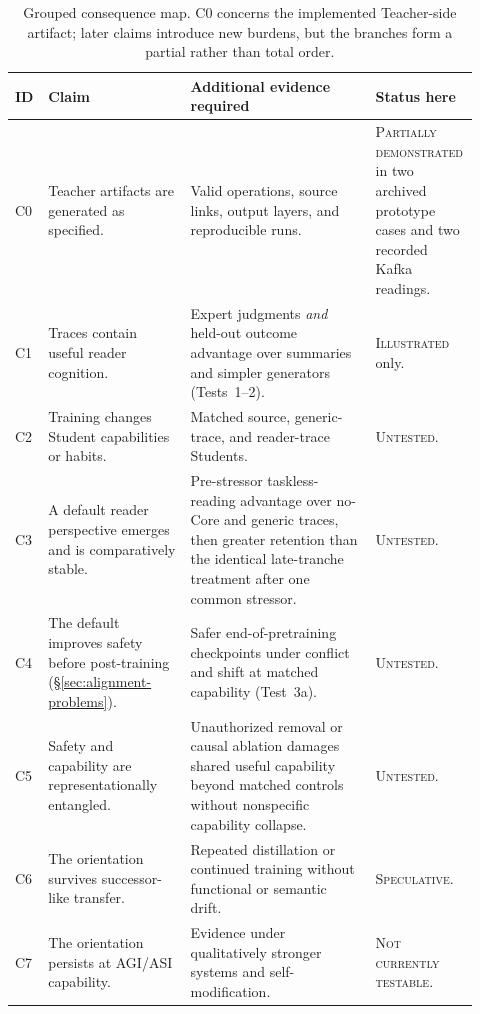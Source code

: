 \documentclass[11pt]{article}
\newcommand{\statusIllustrated}{\textcolor{hypothesisBlue}{\textsc{Illustrated}}}
\newcommand{\statusUntested}{\textcolor{hypothesisBlue}{\textsc{Untested}}}
\newcommand{\statusSpeculative}{\textcolor{speculationPurple}{\textsc{Speculative}}}
\newcommand{\statusNotTestable}{\textcolor{speculationPurple}{\textsc{Not currently testable}}}
\begin{document}
\begin{table}[H]
\centering
\small
\begin{tabular}{@{}>{\raggedright\arraybackslash}p{0.07\linewidth}
                    >{\raggedright\arraybackslash}p{0.30\linewidth}
                    >{\raggedright\arraybackslash}p{0.39\linewidth}
                    >{\raggedright\arraybackslash}p{0.16\linewidth}@{}}
\toprule
\textbf{ID} & \textbf{Claim} & \textbf{Additional evidence required} & \textbf{Status here} \\
\midrule
C0 & Teacher artifacts are generated as specified. & Valid operations, source links, output layers, and reproducible runs. & \textcolor{hypothesisBlue}{\textsc{Partially demonstrated}} in two archived prototype cases and two recorded Kafka readings. \\
C1 & Traces contain useful reader cognition. & Expert judgments \emph{and} held-out outcome advantage over summaries and simpler generators (Tests~1--2). & \statusIllustrated{} only. \\
C2 & Training changes Student capabilities or habits. & Matched source, generic-trace, and reader-trace Students. & \statusUntested. \\
C3 & A default reader perspective emerges and is comparatively stable. & Pre-stressor taskless-reading advantage over no-Core and generic traces, then greater retention than the identical late-tranche treatment after one common stressor. & \statusUntested. \\
C4 & The default improves safety before post-training (\S\ref{sec:alignment-problems}). & Safer end-of-pretraining checkpoints under conflict and shift at matched capability (Test~3a). & \statusUntested. \\
C5 & Safety and capability are representationally entangled. & Unauthorized removal or causal ablation damages shared useful capability beyond matched controls without nonspecific capability collapse. & \statusUntested. \\
C6 & The orientation survives successor-like transfer. & Repeated distillation or continued training without functional or semantic drift. & \statusSpeculative. \\
C7 & The orientation persists at AGI/ASI capability. & Evidence under qualitatively stronger systems and self-modification. & \statusNotTestable. \\
\bottomrule
\end{tabular}
\caption{Grouped consequence map. C0 concerns the implemented Teacher-side artifact; later claims introduce new burdens, but the branches form a partial rather than total order.}
\label{tab:consequence-ladder}
\end{table}
\end{document}
